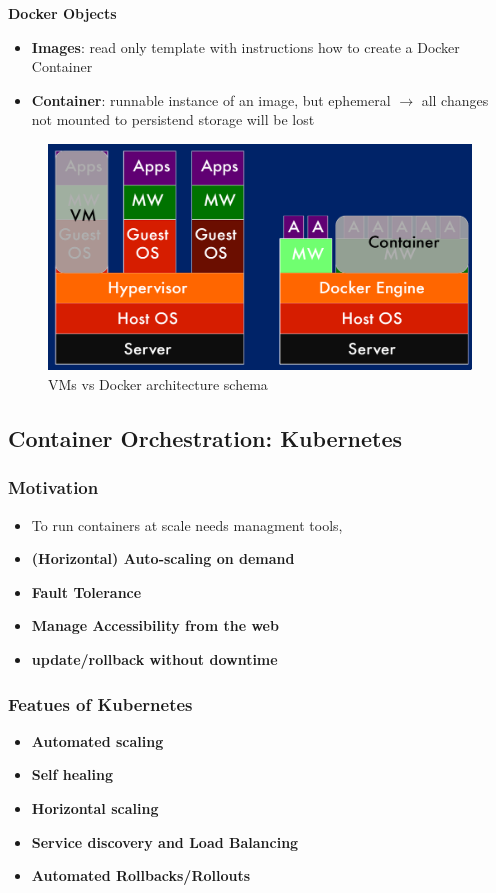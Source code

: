 \documentclass[a4paper]{article}
\begin{document}
\begin{multicols}{3}
\textbf{Docker Objects}
\begin{itemize}
    \item \textbf{Images}: read only template with instructions how to create a Docker Container
    \item \textbf{Container}: runnable instance of an  image, but ephemeral $\rightarrow$ all changes not mounted to persistend storage will be lost
\end{itemize}

\begin{figure}[H]
    \includegraphics[width=\linewidth]{vmvsdocker.png}
    \caption{VMs vs Docker architecture schema}
    \label{fig:vmvsdocker}
\end{figure}

\subsection*{Container Orchestration: Kubernetes}

\subsubsection*{Motivation}
\begin{itemize}
    \item To run containers at scale needs managment tools,
    \item \textbf{(Horizontal) Auto-scaling on demand}
    \item \textbf{Fault Tolerance}
    \item \textbf{Manage Accessibility from the web}
    \item \textbf{update/rollback without downtime}
\end{itemize}

\subsubsection*{Featues of Kubernetes}
\begin{itemize}
    \item \textbf{Automated scaling}
    \item \textbf{Self healing}
    \item \textbf{Horizontal scaling}
    \item \textbf{Service discovery and Load Balancing}
    \item \textbf{Automated Rollbacks/Rollouts}
\end{itemize}


\end{multicols}
\end{document}

